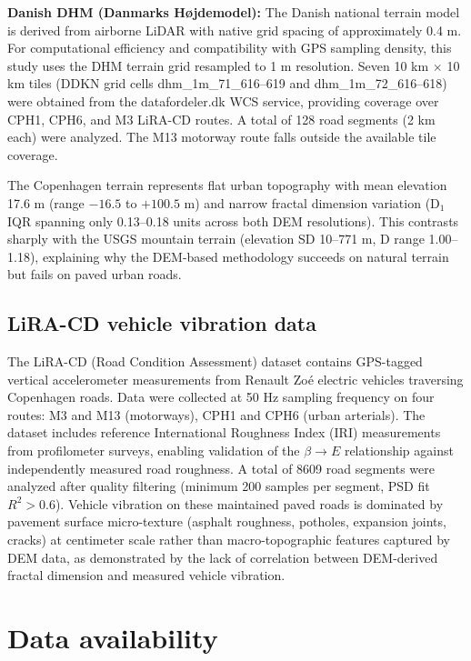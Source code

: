 \documentclass[11pt]{article}
\begin{document}
\textbf{Danish DHM (Danmarks Højdemodel):} The Danish national terrain model is derived from airborne LiDAR with native grid spacing of approximately 0.4 m. For computational efficiency and compatibility with GPS sampling density, this study uses the DHM terrain grid resampled to 1 m resolution. Seven 10 km $\times$ 10 km tiles (DDKN grid cells dhm\_1m\_71\_616--619 and dhm\_1m\_72\_616--618) were obtained from the datafordeler.dk WCS service, providing coverage over CPH1, CPH6, and M3 LiRA-CD routes. A total of 128 road segments (2 km each) were analyzed. The M13 motorway route falls outside the available tile coverage.

The Copenhagen terrain represents flat urban topography with mean elevation 17.6 m (range $-16.5$ to $+100.5$ m) and narrow fractal dimension variation (D$_1$ IQR spanning only 0.13--0.18 units across both DEM resolutions). This contrasts sharply with the USGS mountain terrain (elevation SD 10--771 m, D range 1.00--1.18), explaining why the DEM-based methodology succeeds on natural terrain but fails on paved urban roads.

\subsection*{LiRA-CD vehicle vibration data}

The LiRA-CD (Road Condition Assessment) dataset\cite{Skar2023} contains GPS-tagged vertical accelerometer measurements from Renault Zoé electric vehicles traversing Copenhagen roads. Data were collected at 50 Hz sampling frequency on four routes: M3 and M13 (motorways), CPH1 and CPH6 (urban arterials). The dataset includes reference International Roughness Index (IRI) measurements from profilometer surveys, enabling validation of the $\beta \rightarrow E$ relationship against independently measured road roughness. A total of 8609 road segments were analyzed after quality filtering (minimum 200 samples per segment, PSD fit $R^2 > 0.6$). Vehicle vibration on these maintained paved roads is dominated by pavement surface micro-texture (asphalt roughness, potholes, expansion joints, cracks) at centimeter scale rather than macro-topographic features captured by DEM data, as demonstrated by the lack of correlation between DEM-derived fractal dimension and measured vehicle vibration.


\section*{Data availability}
\end{document}
